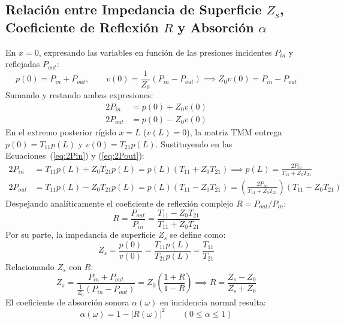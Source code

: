 \documentclass[11pt,a4paper]{article}
\begin{document}
\subsection{\texorpdfstring{Relación entre Impedancia de Superficie $Z_s$, Coeficiente de Reflexión $R$ y Absorción $\alpha$}{Relación entre Impedancia Z\_s, Reflexión R y Absorción alpha}}
En $x = 0$, expresando las variables en función de las presiones incidentes $P_{in}$ y reflejadas $P_{out}$:
\begin{equation}
p(0) = P_{in} + P_{out}, \qquad v(0) = \frac{1}{Z_0} (P_{in} - P_{out}) \implies Z_0 v(0) = P_{in} - P_{out}
\end{equation}
Sumando y restando ambas expresiones:
\begin{align}
2 P_{in} &= p(0) + Z_0 v(0) \label{eq:2Pin}\\
2 P_{out} &= p(0) - Z_0 v(0) \label{eq:2Pout}
\end{align}
En el extremo posterior rígido $x=L$ ($v(L) = 0$), la matriz TMM entrega $p(0) = T_{11} p(L)$ y $v(0) = T_{21} p(L)$. Sustituyendo en las Ecuaciones~(\ref{eq:2Pin}) y (\ref{eq:2Pout}):
\begin{align}
2 P_{in} &= T_{11} p(L) + Z_0 T_{21} p(L) = p(L) (T_{11} + Z_0 T_{21}) \implies p(L) = \frac{2 P_{in}}{T_{11} + Z_0 T_{21}} \\
2 P_{out} &= T_{11} p(L) - Z_0 T_{21} p(L) = p(L) (T_{11} - Z_0 T_{21}) = \left( \frac{2 P_{in}}{T_{11} + Z_0 T_{21}} \right) (T_{11} - Z_0 T_{21})
\end{align}
Despejando analíticamente el coeficiente de reflexión complejo $R = P_{out} / P_{in}$:
\begin{equation}
R = \frac{P_{out}}{P_{in}} = \frac{T_{11} - Z_0 T_{21}}{T_{11} + Z_0 T_{21}}
\end{equation}
Por su parte, la impedancia de superficie $Z_s$ se define como:
\begin{equation}
Z_s = \frac{p(0)}{v(0)} = \frac{T_{11} p(L)}{T_{21} p(L)} = \frac{T_{11}}{T_{21}}
\end{equation}
Relacionando $Z_s$ con $R$:
\begin{equation}
Z_s = \frac{P_{in} + P_{out}}{\frac{1}{Z_0}(P_{in} - P_{out})} = Z_0 \left( \frac{1 + R}{1 - R} \right) \implies R = \frac{Z_s - Z_0}{Z_s + Z_0}
\end{equation}
El coeficiente de absorción sonora $\alpha(\omega)$ en incidencia normal resulta:
\begin{equation}
\alpha(\omega) = 1 - |R(\omega)|^2 \qquad (0 \le \alpha \le 1)
\end{equation}
\end{document}
